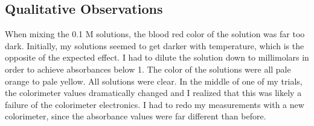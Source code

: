 \subsection{Qualitative Observations}
When mixing the 0.1 M solutions, the blood red color of the solution was far too dark. Initially, my solutions seemed to get darker with temperature, which is the opposite of the expected effect. I had to dilute the solution down to millimolars in order to achieve absorbances below 1. The color of the solutions were all pale orange to pale yellow. All solutions were clear. In the middle of one of my trials, the colorimeter values dramatically changed and I realized that this was likely a failure of the colorimeter electronics. I had to redo my measurements with a new colorimeter, since the absorbance values were far different than before.
